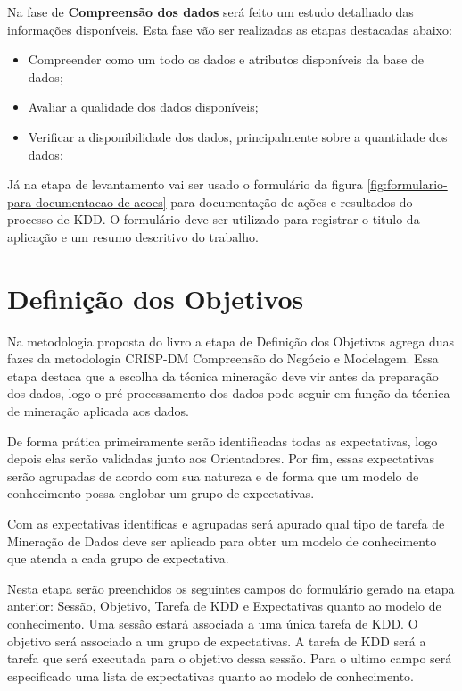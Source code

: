 \documentclass[diss,capa]{texufpel}
\begin{document}
Na fase de \textbf{Compreensão dos dados} será feito um estudo detalhado das informações disponíveis. Esta fase vão ser realizadas as etapas destacadas abaixo:
\begin{itemize}
\item Compreender como um todo os dados e atributos disponíveis da base de dados;
\item Avaliar a qualidade dos dados disponíveis;
\item Verificar a disponibilidade dos dados, principalmente sobre a quantidade dos dados;
\end{itemize}

Já na etapa de levantamento vai ser usado o formulário da figura \ref{fig:formulario-para-documentacao-de-acoes} para documentação de ações e resultados do processo de KDD. O formulário deve ser utilizado para registrar o titulo da aplicação e um resumo descritivo do trabalho.



\section{Definição dos Objetivos}
\label{sec:definicao-dos-objetivos}

Na metodologia proposta do livro a etapa de Definição dos Objetivos agrega duas fazes da metodologia CRISP-DM Compreensão do Negócio e Modelagem. Essa etapa destaca que a escolha da técnica mineração deve vir antes da preparação dos dados, logo o pré-processamento dos dados pode seguir em função da técnica de mineração aplicada aos dados.

De forma prática primeiramente serão identificadas todas as expectativas, logo depois elas serão validadas junto aos Orientadores. Por fim, essas expectativas serão agrupadas de acordo com sua natureza e de forma que um modelo de conhecimento possa englobar um grupo de expectativas.

Com as expectativas identificas e agrupadas será apurado qual tipo de tarefa de Mineração de Dados deve ser aplicado para obter um modelo de conhecimento que atenda a cada grupo de expectativa.

Nesta etapa serão preenchidos os seguintes campos do formulário gerado na etapa anterior: Sessão, Objetivo, Tarefa de KDD e Expectativas quanto ao modelo de conhecimento.
Uma sessão estará associada a uma única tarefa de KDD. O objetivo será associado a um grupo de expectativas. A tarefa de KDD será a tarefa que será executada para o objetivo dessa sessão. Para o ultimo campo será especificado uma lista de expectativas quanto ao modelo de conhecimento.
\end{document}
